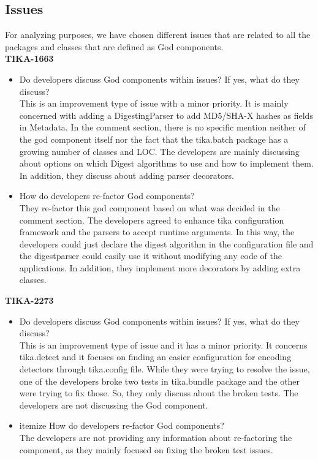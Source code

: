 \documentclass{article}
\begin{document}
\subsection{Issues}
For analyzing purposes, we have chosen different issues that are related to all the packages and classes that are defined as God components. \\
\textbf{TIKA-1663}
\begin{itemize}
    \item Do developers discuss God components within issues? If yes, what do they discuss?\\
    This is an improvement type of issue with a minor priority. It is mainly concerned with adding a DigestingParser to add MD5/SHA-X hashes as fields in Metadata. In the comment section, there is no specific mention neither of the god component itself nor the fact that the tika.batch package has a growing number of classes and LOC. The developers are mainly discussing about options on which Digest algorithms to use and how to implement them.  In addition, they discuss about adding parser decorators.
    \item How do developers re-factor God components?\\
    They re-factor this god component based on what was decided in the comment section. The developers agreed to enhance tika configuration framework and the parsers to accept runtime arguments. In this way, the developers could just declare the digest algorithm in the configuration file and the digestparser could easily use it without modifying any code of the applications. In addition, they implement more decorators by adding extra classes.
\end{itemize}

\textbf{TIKA-2273}
\begin{itemize}
    \item Do developers discuss God components within issues? If yes, what do they discuss?\\
    This is an improvement type of issue and it has a minor priority. It concerns tika.detect and it focuses on finding an easier configuration for encoding detectors through tika.config file. While they were trying to resolve the issue, one of the developers broke two tests in tika.bundle package and the other were trying to fix those. So, they only discuss about the broken tests. The developers are not discussing the God component.
    \item{itemize}	How do developers re-factor God components?\\
    The developers are not providing any information about re-factoring the component, as they mainly focused on fixing the broken test issues.
\end{itemize}
\end{document}
